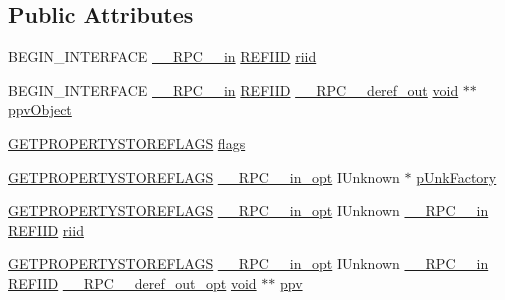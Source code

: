 \subsection*{Public Attributes}
\begin{DoxyCompactItemize}
\item 
B\+E\+G\+I\+N\+\_\+\+I\+N\+T\+E\+R\+F\+A\+CE \hyperlink{rpcsal_8h_a20b7f6da600a05c8b541659f14f7f0e6}{\+\_\+\+\_\+\+R\+P\+C\+\_\+\+\_\+in} \hyperlink{px__win__ds_8c_a80ec49c8ae61e234197d5071d2df497d}{R\+E\+F\+I\+ID} \hyperlink{struct_i_delayed_property_store_factory_vtbl_a5671774445bdce04fb3ac0c9015d2ab2}{riid}
\item 
B\+E\+G\+I\+N\+\_\+\+I\+N\+T\+E\+R\+F\+A\+CE \hyperlink{rpcsal_8h_a20b7f6da600a05c8b541659f14f7f0e6}{\+\_\+\+\_\+\+R\+P\+C\+\_\+\+\_\+in} \hyperlink{px__win__ds_8c_a80ec49c8ae61e234197d5071d2df497d}{R\+E\+F\+I\+ID} \hyperlink{rpcsal_8h_a23bc188526f10656f9c79d950f6c3192}{\+\_\+\+\_\+\+R\+P\+C\+\_\+\+\_\+deref\+\_\+out} \hyperlink{sound_8c_ae35f5844602719cf66324f4de2a658b3}{void} $\ast$$\ast$ \hyperlink{struct_i_delayed_property_store_factory_vtbl_a57f59525ad8b65d5fd4e893c93774c33}{ppv\+Object}
\item 
\hyperlink{propsys_8h_a9db84a5b338e0b1423020b4294cef38b}{G\+E\+T\+P\+R\+O\+P\+E\+R\+T\+Y\+S\+T\+O\+R\+E\+F\+L\+A\+GS} \hyperlink{struct_i_delayed_property_store_factory_vtbl_a31e3ba42f498de90fd0a9b1a5e335924}{flags}
\item 
\hyperlink{propsys_8h_a9db84a5b338e0b1423020b4294cef38b}{G\+E\+T\+P\+R\+O\+P\+E\+R\+T\+Y\+S\+T\+O\+R\+E\+F\+L\+A\+GS} \hyperlink{rpcsal_8h_a6e152ac84637d70f0453366759b3b9fb}{\+\_\+\+\_\+\+R\+P\+C\+\_\+\+\_\+in\+\_\+opt} I\+Unknown $\ast$ \hyperlink{struct_i_delayed_property_store_factory_vtbl_a60b7fcd06445bce76571127bcf8b17d8}{p\+Unk\+Factory}
\item 
\hyperlink{propsys_8h_a9db84a5b338e0b1423020b4294cef38b}{G\+E\+T\+P\+R\+O\+P\+E\+R\+T\+Y\+S\+T\+O\+R\+E\+F\+L\+A\+GS} \hyperlink{rpcsal_8h_a6e152ac84637d70f0453366759b3b9fb}{\+\_\+\+\_\+\+R\+P\+C\+\_\+\+\_\+in\+\_\+opt} I\+Unknown \hyperlink{rpcsal_8h_a20b7f6da600a05c8b541659f14f7f0e6}{\+\_\+\+\_\+\+R\+P\+C\+\_\+\+\_\+in} \hyperlink{px__win__ds_8c_a80ec49c8ae61e234197d5071d2df497d}{R\+E\+F\+I\+ID} \hyperlink{struct_i_delayed_property_store_factory_vtbl_a2a5a28cd4a2da2ce9d865b8b54bf0ebc}{riid}
\item 
\hyperlink{propsys_8h_a9db84a5b338e0b1423020b4294cef38b}{G\+E\+T\+P\+R\+O\+P\+E\+R\+T\+Y\+S\+T\+O\+R\+E\+F\+L\+A\+GS} \hyperlink{rpcsal_8h_a6e152ac84637d70f0453366759b3b9fb}{\+\_\+\+\_\+\+R\+P\+C\+\_\+\+\_\+in\+\_\+opt} I\+Unknown \hyperlink{rpcsal_8h_a20b7f6da600a05c8b541659f14f7f0e6}{\+\_\+\+\_\+\+R\+P\+C\+\_\+\+\_\+in} \hyperlink{px__win__ds_8c_a80ec49c8ae61e234197d5071d2df497d}{R\+E\+F\+I\+ID} \hyperlink{rpcsal_8h_ab29e89ceb0eb0b075c6f6299b0de6a21}{\+\_\+\+\_\+\+R\+P\+C\+\_\+\+\_\+deref\+\_\+out\+\_\+opt} \hyperlink{sound_8c_ae35f5844602719cf66324f4de2a658b3}{void} $\ast$$\ast$ \hyperlink{struct_i_delayed_property_store_factory_vtbl_a0cafe89cfd335f33fc32b73b06557d6b}{ppv}

\end{DoxyCompactItemize}
